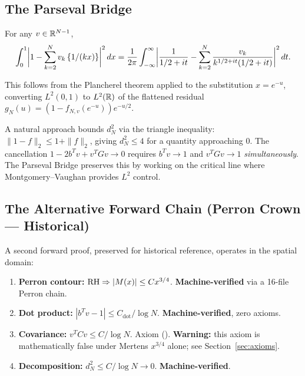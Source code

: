 \documentclass[11pt,a4paper]{article}
\begin{document}
\subsection{The Parseval Bridge}

\begin{theorem}
\label{thm:parseval}
For any $v \in \mathbb{R}^{N-1}$,
\[
  \int_0^1 \biggl|1 - \sum_{k=2}^N v_k\,\{1/(kx)\}\biggr|^2\,dx
  = \frac{1}{2\pi} \int_{-\infty}^{\infty}
    \biggl|\frac{1}{1/2+it} - \sum_{k=2}^N
    \frac{v_k}{k^{1/2+it}(1/2+it)}\biggr|^2\,dt.
\]
\end{theorem}

This follows from the Plancherel theorem applied to the substitution
$x = e^{-u}$, converting $L^2(0,1)$ to $L^2(\mathbb{R})$ of the flattened
residual $g_N(u) = (1 - f_{N,v}(e^{-u}))e^{-u/2}$.

\begin{remark}
\label{rem:triangle}
A natural approach bounds $d_N^2$ via the triangle inequality:
$\|1-f\|_2 \leq 1 + \|f\|_2$, giving $d_N^2 \leq 4$ for a quantity
approaching $0$. The cancellation $1 - 2b^Tv + v^TGv \to 0$ requires
$b^Tv \to 1$ and $v^TGv \to 1$ \emph{simultaneously}. The Parseval
Bridge preserves this by working on the critical line where
Montgomery--Vaughan provides $L^2$ control.
\end{remark}

\subsection{The Alternative Forward Chain (Perron Crown --- Historical)}

A second forward proof, preserved for historical reference,
operates in the spatial domain:
\begin{enumerate}
  \item \textbf{Perron contour:} $\mathrm{RH} \Rightarrow |M(x)| \leq Cx^{3/4}$.
    \textbf{Machine-verified} via a 16-file Perron chain.
  \item \textbf{Dot product:} $|b^Tv - 1| \leq C_{\mathrm{dot}}/\log N$.
    \textbf{Machine-verified}, zero axioms.
  \item \textbf{Covariance:} $v^TCv \leq C/\log N$.
    Axiom ().
    \textbf{Warning:} this axiom is mathematically false under
    Mertens $x^{3/4}$ alone; see Section~\ref{sec:axioms}.
  \item \textbf{Decomposition:} $d_N^2 \leq C/\log N \to 0$.
    \textbf{Machine-verified}.
\end{enumerate}
\end{document}
